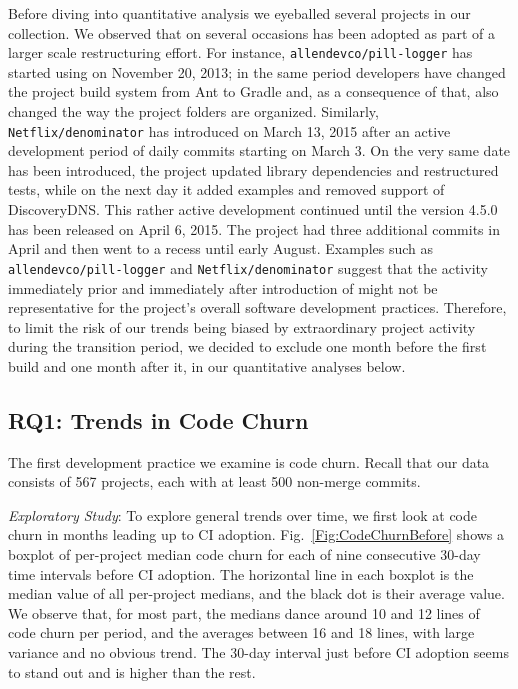 Before diving into quantitative analysis we eyeballed several projects in our 
collection. 
We observed that on several occasions \Tvis has been adopted as part of a 
larger scale restructuring effort. 
For instance, \texttt{allendevco/pill-logger} has started using \Tvis on November 
20, 2013; in the same period developers have changed the project build system 
from Ant to Gradle and, as a consequence of that, also changed the way the 
project folders are organized.
Similarly, \texttt{Netflix/denominator} has introduced \Tvis on March 13, 2015
after an active development period of daily commits starting on March 3.
On the very same date \Tvis has been introduced, the project updated library 
dependencies and restructured tests, while on the next day it added examples 
and removed support of DiscoveryDNS.
This rather active development continued until the version 4.5.0 has been 
released on April 6, 2015.
The project had three additional commits in April and then went to a recess 
until early August. 
Examples such as \texttt{allendevco/pill-logger} and \texttt{Netflix/denominator} 
suggest that the activity immediately prior and immediately after introduction 
of \Tvis might not be representative for the project's overall software development
practices.
Therefore, to limit the risk of our trends being biased by extraordinary project 
activity during the transition period, we decided to exclude one month before 
the first \Tvis build and one month after it, in our quantitative analyses below.

\subsection{RQ1: Trends in Code Churn}

The first development practice we examine is code churn.
Recall that our data consists of 567 projects, each with at least 500 non-merge 
commits.

\smallskip\noindent \emph{Exploratory Study}: To explore general trends over 
time, we first look at code churn in months leading up to CI adoption.
Fig.~\ref{Fig:CodeChurnBefore} shows a boxplot of per-project median code 
churn for each of nine consecutive 30-day time intervals before CI adoption.
The horizontal line in each boxplot is the median value of all per-project medians, 
and the black dot is their average value.
We observe that, for most part, the medians dance around 10 and 12 lines of 
code churn per period, and the averages between 16 and 18 lines, with large 
variance and no obvious trend. 
The 30-day interval just before CI adoption seems to stand out and is higher 
than the rest.

